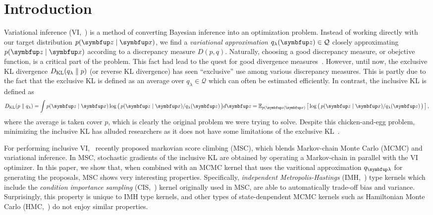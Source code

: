 
\section{Introduction}
Variational inference (VI,~\citealt{jordan_introduction_1999, blei_variational_2017}) is a method of converting Bayesian inference into an optimization problem.
Instead of working directly with our target distribution \(p(\vz\mid\vx)\), we find a \textit{variational approximation} \(q_{\lambda}(\vz) \in \mathcal{Q}\) closely approximating \(p(\vz\mid\vx)\) according to a discrepancy measure \(D(p, q)\).
Naturally, choosing a good discrepancy measure, or obejctive function, is a critical part of the problem.
This fact had lead to the quest for good divergence measures~\citep{NIPS2016_7750ca35, NIPS2017_35464c84, pmlr-v97-ruiz19a}.
However, until now, the exclusive KL divergence \(D_{\mathrm{KL}}(q_{\lambda}\parallel p)\) (or reverse KL divergence) has seen ``exclusive'' use among various discrepancy measures.
This is partly due to the fact that the exclusive KL is defined as an average over \(q_{\lambda} \in \mathcal{Q}\) which can often be estimated efficiently.
In contrast, the inclusive KL is defined as
%
\begin{align}
  \DKL{p}{q_{\lambda}} = \int p(\vz\mid\vx) \log\big(\, p(\vz\mid\vx)/q_{\lambda}(\vz) \,\big)d\vz
  = \Esub{p(\vz\mid\vx)}{\log\big(\, p(\vz\mid\vx)/q_{\lambda}(\vz) \,\big) }, \label{eq:klpq}
\end{align}
%
where the average is taken cover \(p\), which is clearly the original problem we were trying to solve.
Despite this chicken-and-egg problem, minimizing the inclusive KL has alluded researchers as it does not have some limitations of the exclusive KL~\citep{minka2005divergence, mackay_local_2001}.

For performing inclusive VI,~\citet{NEURIPS2020_b2070693} recently proposed markovian score climbing (MSC), which blends Markov-chain Monte Carlo (MCMC) and variational inference.
In MSC, stochastic gradients of the inclusive KL are obtained by operating a Markov-chain in parallel with the VI optimizer.
In this paper, we show that, when combined with an MCMC kernel that uses the varitional approximation \(q_{\vlambda}\) for generating the proposals, MSC shows very interesting properties.
Specifically, \textit{independent Metropolis-Hastings} (IMH,~\citealt{robert_monte_2004}) type kernels which include the \textit{condition importance sampling} (CIS,~\citealt{NEURIPS2020_b2070693}) kernel originally used in MSC, are able to automatically trade-off bias and variance.
Surprisingly, this property is unique to IMH type kernels, and other types of state-denpendent MCMC kernels such as Hamiltonian Monte Carlo (HMC,~\citealt{duane_hybrid_1987, neal_mcmc_2011, betancourt_conceptual_2017}) do not enjoy similar properties.

